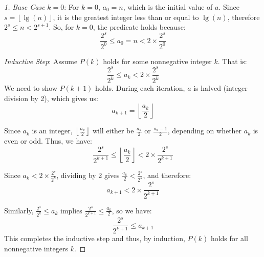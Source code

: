 \begin{proof}[1]
    \textit{Base Case} \(k=0\):
For \(k = 0\), \(a_0 = n\), which is the initial value of \(a\). Since \(s = \left\lfloor \lg(n) \right\rfloor\), it is the greatest integer less than or equal to \(\lg(n)\), therefore \(2^s \leq n < 2^{s+1}\). So, for \(k = 0\), the predicate holds because:
\[
\frac{2^s}{2^0} \leq a_0 = n < 2 \times \frac{2^s}{2^0}
\]

\textit{Inductive Step}:
Assume \(P(k)\) holds for some nonnegative integer \(k\). That is:
\[
\frac{2^s}{2^k} \leq a_k < 2 \times \frac{2^s}{2^k}
\]
We need to show \(P(k+1)\) holds. During each iteration, \(a\) is halved (integer division by 2), which gives us:
\[
a_{k+1} = \left\lfloor \frac{a_k}{2} \right\rfloor
\]

Since \(a_k\) is an integer, \(\left\lfloor \frac{a_k}{2} \right\rfloor\) will either be \(\frac{a_k}{2}\) or \(\frac{a_k - 1}{2}\), depending on whether \(a_k\) is even or odd. Thus, we have:
\[
\frac{2^s}{2^{k+1}} \leq \left\lfloor \frac{a_k}{2} \right\rfloor < 2 \times \frac{2^s}{2^{k+1}}
\]

Since \(a_k < 2 \times \frac{2^s}{2^k}\), dividing by 2 gives \(\frac{a_k}{2} < \frac{2^s}{2^k}\), and therefore:
\[
a_{k+1} < 2 \times \frac{2^s}{2^{k+1}}
\]

Similarly, \(\frac{2^s}{2^k} \leq a_k\) implies \(\frac{2^s}{2^{k+1}} \leq \frac{a_k}{2}\), so we have:
\[
\frac{2^s}{2^{k+1}} \leq a_{k+1}
\]
This completes the inductive step and thus, by induction, \(P(k)\) holds for all nonnegative integers \(k\).
\end{proof}
